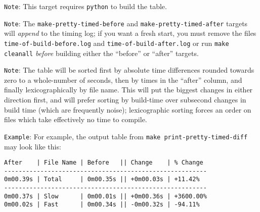 \begin{itemize}
  \texttt{Note}: This target requires \texttt{python} to build the table.

  \texttt{Note}: The \texttt{make-pretty-timed-before} and
  \texttt{make-pretty-timed-after} targets will \emph{append} to the
  timing log; if you want a fresh start, you must remove the files
  \texttt{time-of-build-before.log} and
  \texttt{time-of-build-after.log} or run \texttt{make cleanall}
  \emph{before} building either the ``before'' or ``after'' targets.

  \texttt{Note}: The table will be sorted first by absolute time
  differences rounded towards zero to a whole-number of seconds, then
  by times in the ``after'' column, and finally lexicographically by
  file name.  This will put the biggest changes in either direction
  first, and will prefer sorting by build-time over subsecond changes
  in build time (which are frequently noise); lexicographic sorting
  forces an order on files which take effectively no time to compile.

  \texttt{Example}: For example, the output table from \texttt{make
    print-pretty-timed-diff} may look like this:
\begin{verbatim}
After    | File Name | Before   || Change    | % Change
--------------------------------------------------------
0m00.39s | Total     | 0m00.35s || +0m00.03s | +11.42%
--------------------------------------------------------
0m00.37s | Slow      | 0m00.01s || +0m00.36s | +3600.00%
0m00.02s | Fast      | 0m00.34s || -0m00.32s | -94.11%
\end{verbatim}
\end{itemize}

